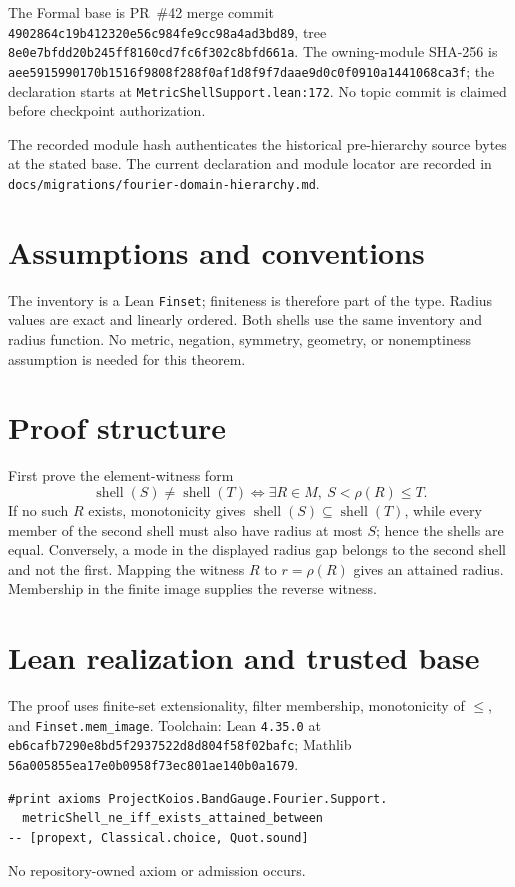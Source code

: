 \documentclass[10pt]{article}
\begin{document}
The Formal base is PR~\#42 merge commit
\texttt{4902864c19b412320e56c984fe9cc98a4ad3bd89}, tree
\texttt{8e0e7bfdd20b245ff8160cd7fc6f302c8bfd661a}. The owning-module SHA-256 is
\texttt{aee5915990170b1516f9808f288f0af1d8f9f7daae9d0c0f0910a1441068ca3f}; the declaration
starts at \texttt{MetricShellSupport.lean:172}. No topic commit is claimed before checkpoint
authorization.

The recorded module hash authenticates the historical pre-hierarchy source bytes at the stated base. The current declaration and module locator are recorded in \texttt{docs/migrations/fourier-domain-hierarchy.md}.

\section{Assumptions and conventions}
The inventory is a Lean \texttt{Finset}; finiteness is therefore part of the type. Radius values
are exact and linearly ordered. Both shells use the same inventory and radius function. No metric,
negation, symmetry, geometry, or nonemptiness assumption is needed for this theorem.

\section{Proof structure}
First prove the element-witness form
\[
 \operatorname{shell}(S)\ne\operatorname{shell}(T)
 \Longleftrightarrow
 \exists R\in M,\ S<\rho(R)\le T.
\]
If no such $R$ exists, monotonicity gives
$\operatorname{shell}(S)\subseteq\operatorname{shell}(T)$, while every member of the second shell
must also have radius at most $S$; hence the shells are equal. Conversely, a mode in the displayed
radius gap belongs to the second shell and not the first. Mapping the witness $R$ to $r=\rho(R)$
gives an attained radius. Membership in the finite image supplies the reverse witness.

\section{Lean realization and trusted base}
The proof uses finite-set extensionality, filter membership, monotonicity of $\le$, and
\texttt{Finset.mem\_image}. Toolchain: Lean \texttt{4.35.0} at
\texttt{eb6cafb7290e8bd5f2937522d8d804f58f02bafc}; Mathlib
\texttt{56a005855ea17e0b0958f73ec801ae140b0a1679}.
\begin{verbatim}
#print axioms ProjectKoios.BandGauge.Fourier.Support.
  metricShell_ne_iff_exists_attained_between
-- [propext, Classical.choice, Quot.sound]
\end{verbatim}
No repository-owned axiom or admission occurs.
\end{document}
